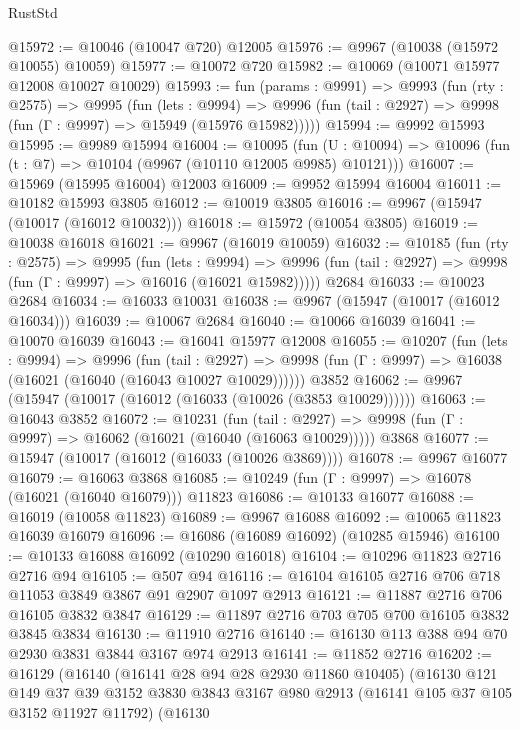\begin{lexlean}{RustStd}
\begin{coremodule}
{\begin{coremodule}
{{{{{{{{{{{{{{{{{{{{{{{{{{{{{{{{{{{{{{{{{{{{{{{{{{{{{{{{{{{{{{{{{{{{{{{{{{{{{{@15972 := @10046 (@10047 @720) @12005
@15976 := @9967 (@10038 (@15972 @10055) @10059)
@15977 := @10072 @720
@15982 := @10069 (@10071 @15977 @12008 @10027 @10029)
@15993 := fun (params : @9991) =>
  @9993
    (fun (rty : @2575) =>
    @9995
      (fun (lets : @9994) =>
      @9996 (fun (tail : @2927) => @9998 (fun (Γ : @9997) => @15949 (@15976 @15982)))))
@15994 := @9992 @15993
@15995 := @9989 @15994
@16004 := @10095
    (fun (U : @10094) => @10096 (fun (t : @7) => @10104 (@9967 (@10110 @12005 @9985) @10121)))
@16007 := @15969 (@15995 @16004) @12003
@16009 := @9952 @15994 @16004
@16011 := @10182 @15993 @3805
@16012 := @10019 @3805
@16016 := @9967 (@15947 (@10017 (@16012 @10032)))
@16018 := @15972 (@10054 @3805)
@16019 := @10038 @16018
@16021 := @9967 (@16019 @10059)
@16032 := @10185
    (fun (rty : @2575) =>
    @9995
      (fun (lets : @9994) =>
      @9996 (fun (tail : @2927) => @9998 (fun (Γ : @9997) => @16016 (@16021 @15982)))))
    @2684
@16033 := @10023 @2684
@16034 := @16033 @10031
@16038 := @9967 (@15947 (@10017 (@16012 @16034)))
@16039 := @10067 @2684
@16040 := @10066 @16039
@16041 := @10070 @16039
@16043 := @16041 @15977 @12008
@16055 := @10207
    (fun (lets : @9994) =>
    @9996
      (fun (tail : @2927) =>
      @9998 (fun (Γ : @9997) => @16038 (@16021 (@16040 (@16043 @10027 @10029))))))
    @3852
@16062 := @9967 (@15947 (@10017 (@16012 (@16033 (@10026 (@3853 @10029))))))
@16063 := @16043 @3852
@16072 := @10231
    (fun (tail : @2927) => @9998 (fun (Γ : @9997) => @16062 (@16021 (@16040 (@16063 @10029)))))
    @3868
@16077 := @15947 (@10017 (@16012 (@16033 (@10026 @3869))))
@16078 := @9967 @16077
@16079 := @16063 @3868
@16085 := @10249 (fun (Γ : @9997) => @16078 (@16021 (@16040 @16079))) @11823
@16086 := @10133 @16077
@16088 := @16019 (@10058 @11823)
@16089 := @9967 @16088
@16092 := @10065 @11823 @16039 @16079
@16096 := @16086 (@16089 @16092) (@10285 @15946)
@16100 := @10133 @16088 @16092 (@10290 @16018)
@16104 := @10296 @11823 @2716 @2716 @94
@16105 := @507 @94
@16116 := @16104 @16105 @2716 @706 @718 @11053 @3849 @3867 @91 @2907 @1097 @2913
@16121 := @11887 @2716 @706 @16105 @3832 @3847
@16129 := @11897 @2716 @703 @705 @700 @16105 @3832 @3845 @3834
@16130 := @11910 @2716
@16140 := @16130 @113 @388 @94 @70 @2930 @3831 @3844 @3167 @974 @2913
@16141 := @11852 @2716
@16202 := @16129
    (@16140
      (@16141 @28 @94 @28 @2930 @11860 @10405)
      (@16130
        @121
        @149
        @37
        @39
        @3152
        @3830
        @3843
        @3167
        @980
        @2913
        (@16141 @105 @37 @105 @3152 @11927 @11792)
        (@16130
}}}}}}}}}}}}}}}}}}}}}}}}}}}}}}}}}}}}}}}}}}}}}}}}}}}}}}}}}}}}}}}}}}}}}}}}}}}}}}
\end{coremodule}}
\end{coremodule}
\end{lexlean}
